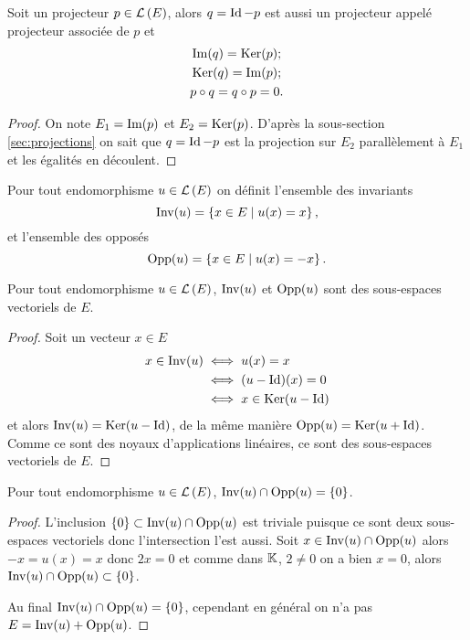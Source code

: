 \begin{prop}
  Soit un projecteur \(p \in \mathcal{L}\left(E\right)\), alors \(q=\operatorname{Id}-p\) est aussi un projecteur appelé projecteur associée de \(p\) et
  \begin{gather}
    \operatorname{Im}(q) = \operatorname{Ker}(p);\\
    \operatorname{Ker}(q)=\operatorname{Im}(p);\\
    p \circ q = q \circ p =0.
  \end{gather}
\end{prop}
\begin{proof}
  On note \(E_1 = \operatorname{Im}(p)\) et \(E_2 = \operatorname{Ker}(p)\). D'après la sous-section~
  \ref{sec:projections} on sait que \(q=\operatorname{Id}-p\) est la projection sur \(E_2\) parallèlement à \(E_1\) et les égalités en découlent.
\end{proof}

\begin{defdef}
  Pour tout endomorphisme \(u \in \mathcal{L}\left(E\right)\) on définit l'ensemble des invariants
  \begin{equation}
    \operatorname{Inv}(u)=\left\{x \in E\mathrel{}\middle|\mathrel{}u(x)=x\right\},
  \end{equation}
  et l'ensemble des opposés
  \begin{equation}
    \operatorname{Opp}(u)=\left\{x \in E\mathrel{}\middle|\mathrel{}u(x)=-x\right\}.
  \end{equation}
\end{defdef}

\begin{prop}
  Pour tout endomorphisme \(u \in \mathcal{L}\left(E\right)\), \(\operatorname{Inv}(u)\) et \(\operatorname{Opp}(u)\) sont des sous-espaces vectoriels de \(E\).
\end{prop}
\begin{proof}
  Soit un vecteur \(x \in E\)
  \begin{align}
    x \in \operatorname{Inv}(u) &\iff u(x) = x \\
                  &\iff (u-\operatorname{Id})(x)=0 \\
                  &\iff x \in \operatorname{Ker}(u-\operatorname{Id})
  \end{align}
  et alors \(\operatorname{Inv}(u) = \operatorname{Ker}(u-\operatorname{Id})\), de la même manière \(\operatorname{Opp}(u) = \operatorname{Ker}(u+\operatorname{Id})\). Comme ce sont des noyaux d'applications linéaires, ce sont des sous-espaces vectoriels de \(E\).
\end{proof}

\begin{prop}
  Pour tout endomorphisme \(u \in \mathcal{L}\left(E\right)\), \(\operatorname{Inv}(u) \cap \operatorname{Opp}(u) = \{0\}\).
\end{prop}
\begin{proof}
  L'inclusion \(\{0\} \subset \operatorname{Inv}(u) \cap \operatorname{Opp}(u)\) est triviale puisque ce sont deux sous-espaces vectoriels donc l'intersection l'est aussi. Soit \(x \in \operatorname{Inv}(u) \cap \operatorname{Opp}(u)\) alors \(-x=u(x)=x\) donc \(2x=0\) et comme dans \(\mathbb{K}\), \(2\neq 0\) on a bien \(x=0\), alors \(\operatorname{Inv}(u) \cap \operatorname{Opp}(u) \subset \{0\}\).

  Au final \(\operatorname{Inv}(u) \cap \operatorname{Opp}(u) = \{0\}\), cependant en général on n'a pas \(E = \operatorname{Inv}(u)+\operatorname{Opp}(u)\).
\end{proof}

